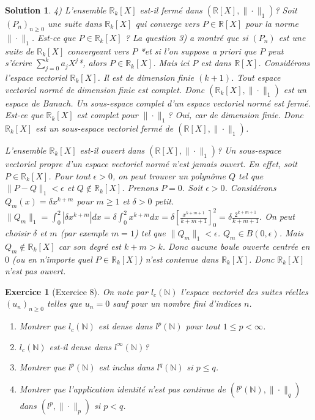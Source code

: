 \documentclass{article}
\newtheorem{solution}{Solution}
\newtheorem{exercise}{Exercice} %
\begin{document}
\begin{solution}
4) L'ensemble $\mathbb{R}_k[X]$ est-il fermé dans $(\mathbb{R}[X], \| \cdot \|_1)$?
Soit $(P_n)_{n \ge 0}$ une suite dans $\mathbb{R}_k[X]$ qui converge vers $P \in \mathbb{R}[X]$ pour la norme $\| \cdot \|_1$.
Est-ce que $P \in \mathbb{R}_k[X]$ ?
La question 3) a montré que si $(P_n)$ est une suite de $\mathbb{R}_k[X]$ convergeant vers $P$ *et si l'on suppose a priori que $P$ peut s'écrire $\sum_{j=0}^k a_j X^j$*, alors $P \in \mathbb{R}_k[X]$. Mais ici $P$ est dans $\mathbb{R}[X]$.
Considérons l'espace vectoriel $\mathbb{R}_k[X]$. Il est de dimension finie $(k+1)$. Tout espace vectoriel normé de dimension finie est complet. Donc $(\mathbb{R}_k[X], \| \cdot \|_1)$ est un espace de Banach.
Un sous-espace complet d'un espace vectoriel normé est fermé.
Est-ce que $\mathbb{R}_k[X]$ est complet pour $\| \cdot \|_1$? Oui, car de dimension finie.
Donc $\mathbb{R}_k[X]$ est un sous-espace vectoriel fermé de $(\mathbb{R}[X], \| \cdot \|_1)$.

L'ensemble $\mathbb{R}_k[X]$ est-il ouvert dans $(\mathbb{R}[X], \| \cdot \|_1)$?
Un sous-espace vectoriel propre d'un espace vectoriel normé n'est jamais ouvert.
En effet, soit $P \in \mathbb{R}_k[X]$. Pour tout $\epsilon > 0$, on peut trouver un polynôme $Q$ tel que $\|P-Q\|_1 < \epsilon$ et $Q \notin \mathbb{R}_k[X]$.
Prenons $P=0$. Soit $\epsilon > 0$. Considérons $Q_m(x) = \delta x^{k+m}$ pour $m \ge 1$ et $\delta > 0$ petit.
$\|Q_m\|_1 = \int_0^2 |\delta x^{k+m}| dx = \delta \int_0^2 x^{k+m} dx = \delta [\frac{x^{k+m+1}}{k+m+1}]_0^2 = \delta \frac{2^{k+m+1}}{k+m+1}$.
On peut choisir $\delta$ et $m$ (par exemple $m=1$) tel que $\|Q_m\|_1 < \epsilon$.
$Q_m \in B(0, \epsilon)$. Mais $Q_m \notin \mathbb{R}_k[X]$ car son degré est $k+m > k$.
Donc aucune boule ouverte centrée en $0$ (ou en n'importe quel $P \in \mathbb{R}_k[X]$) n'est contenue dans $\mathbb{R}_k[X]$.
Donc $\mathbb{R}_k[X]$ n'est pas ouvert.
\end{solution}

\begin{exercise}[Exercice 8]
On note par $l_c(\mathbb{N})$ l'espace vectoriel des suites réelles $(u_n)_{n \ge 0}$ telles que $u_n = 0$ sauf pour un nombre fini d'indices $n$.
\begin{enumerate}
    \item Montrer que $l_c(\mathbb{N})$ est dense dans $l^p(\mathbb{N})$ pour tout $1 \le p < \infty$.
    \item $l_c(\mathbb{N})$ est-il dense dans $l^\infty(\mathbb{N})$?
    \item Montrer que $l^p(\mathbb{N})$ est inclus dans $l^q(\mathbb{N})$ si $p \le q$.
    \item Montrer que l'application identité n'est pas continue de $(l^p(\mathbb{N}), \| \cdot \|_q)$ dans $(l^p, \| \cdot \|_p)$ si $p < q$.
\end{enumerate}
\end{exercise}
\end{document}

